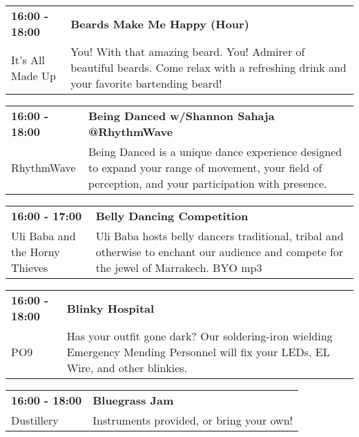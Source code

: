 \begin{tabular}{ p{1in} p{2.2in} }
    \textbf{16:00 - 18:00} & \textbf{Beards Make Me Happy (Hour)} \\
    It's All Made Up \newline  & You! With that amazing beard. You! Admirer of beautiful beards. Come relax with a refreshing drink and your favorite bartending beard! \\
    \hline 
\end{tabular}
    
\begin{tabular}{ p{1in} p{2.2in} }
    \textbf{16:00 - 18:00} & \textbf{Being Danced w/Shannon Sahaja @RhythmWave} \\
    RhythmWave \newline  & Being Danced is a unique dance experience designed to expand your range of movement, your field of perception, and your participation with presence. \\
    \hline 
\end{tabular}
    
\begin{tabular}{ p{1in} p{2.2in} }
    \textbf{16:00 - 17:00} & \textbf{Belly Dancing Competition} \\
    Uli Baba and the Horny Thieves \newline  & Uli Baba hosts belly dancers traditional, tribal and otherwise to
enchant our audience and compete for the jewel of Marrakech. BYO mp3 \\
    \hline 
\end{tabular}
    
\begin{tabular}{ p{1in} p{2.2in} }
    \textbf{16:00 - 18:00} & \textbf{Blinky Hospital} \\
    PO9 \newline  & Has your outfit gone dark?  Our soldering-iron wielding Emergency Mending Personnel will fix your LEDs, EL Wire, and other blinkies. \\
    \hline 
\end{tabular}
    
\begin{tabular}{ p{1in} p{2.2in} }
    \textbf{16:00 - 18:00} & \textbf{Bluegrass Jam} \\
    Dustillery \newline  & Instruments provided, or bring your own! \\
    \hline 
\end{tabular}
    
